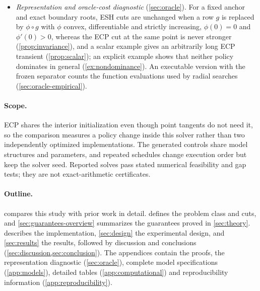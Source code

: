 \begin{itemize}
 \item \emph{Representation and oracle-cost diagnostic} (\cref{sec:oracle}). For a fixed anchor and exact boundary roots, ESH cuts are unchanged when a row $g$ is replaced by $\phi\circ g$ with $\phi$ convex, differentiable and strictly increasing, $\phi(0)=0$ and $\phi'(0)>0$, whereas the ECP cut at the same point is never stronger (\cref{prop:invariance}), and a scalar example gives an arbitrarily long ECP transient (\cref{prop:scalar}); an explicit example shows that neither policy dominates in general (\cref{ex:nondominance}). An executable version with the frozen separator counts the function evaluations used by radial searches (\cref{sec:oracle-empirical}).
\end{itemize}

\paragraph{Scope.}
ECP shares the interior initialization even though point tangents do not need it, so the comparison measures a policy change inside this solver rather than two independently optimized implementations. The generated controls share model structures and parameters, and repeated schedules change execution order but keep the solver seed. Reported solves pass stated numerical feasibility and gap tests; they are not exact-arithmetic certificates.

\paragraph{Outline.}
 compares this study with prior work in detail.  defines the problem class and cuts, and \cref{sec:guarantees-overview} summarizes the guarantees proved in \cref{sec:theory}.  describes the implementation, \cref{sec:design} the experimental design, and \cref{sec:results} the results, followed by discussion and conclusions (\cref{sec:discussion,sec:conclusion}). The appendices contain the proofs, the representation diagnostic (\cref{sec:oracle}), complete model specifications (\cref{app:models}), detailed tables (\cref{app:computational}) and reproducibility information (\cref{app:reproducibility}).
